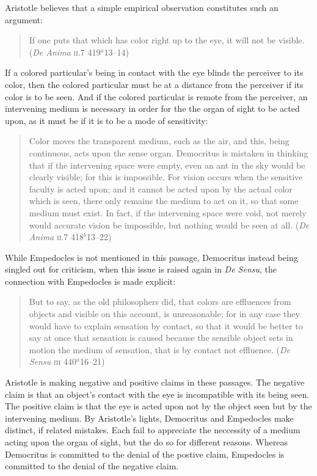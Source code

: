 Aristotle believes that a simple empirical observation constitutes such an argument:
\begin{quote}
	If one puts that which has color right up to the eye, it will not be visible. (\emph{De Anima} \textsc{ii}.7 419\( ^{a} \)13--14)
\end{quote}
If a colored particular's being in contact with the eye blinds the perceiver to its color, then the colored particular must be at a distance from the perceiver if its color is to be seen. And if the colored particular is remote from the perceiver, an intervening medium is necessary in order for the the organ of sight to be acted upon, as it must be if it is to be a mode of sensitivity:
\begin{quote}
	Color moves the transparent medium, such as the air, and this, being continuous, acts upon the sense organ. Democritus is mistaken in thinking that if the intervening space were empty, even an ant in the sky would be clearly visible; for this is impossible. For vision occurs when the sensitive faculty is acted upon; and it cannot be acted upon by the actual color which is seen, there only remains the medium to act on it, so that some medium must exist. In fact, if the intervening space were void, not merely would accurate vision be impossible, but nothing would be seen at all. (\emph{De Anima} \textsc{ii}.7 418\( ^{b} \)13--22)
\end{quote}

While Empedocles is not mentioned in this passage, Democritus instead being singled out for criticism, when this issue is raised again in \emph{De Sensu}, the connection with Empedocles is made explicit:
\begin{quote}
	But to say, as the old philosophers did, that colors are effluences from objects and visible on this account, is unreasonable; for in any case they would have to explain sensation by contact, so that it would be better to say at once that sensation is caused because the sensible object sets in motion the medium of sensation, that is by contact not effluence. (\emph{De Sensu} \textsc{iii} 440\( ^{a} \)16--21)
\end{quote}

Aristotle is making negative and positive claims in these passages. The negative claim is that an object's contact with the eye is incompatible with its being seen. The positive claim is that the eye is acted upon not by the object seen but by the intervening medium. By Aristotle's lights, Democritus and Empedocles make distinct, if related mistakes. Each fail to appreciate the neccessity of a medium acting upon the organ of sight, but the do so for different reasons. Whereas Democritus is committed to the denial of the postive claim, Empedocles is committed to the denial of the negative claim.

